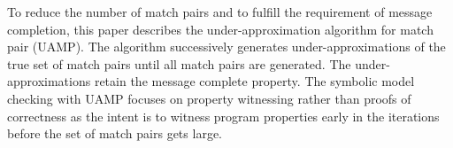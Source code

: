 

To reduce the number of match pairs and to fulfill the requirement of message completion, this paper describes the under-approximation algorithm for match pair (UAMP). The algorithm successively generates under-approximations of the true set of match pairs until all match pairs are generated. The under-approximations retain the message complete property. 
The symbolic model checking with UAMP focuses on property witnessing rather than proofs of correctness as the intent is to witness program properties early in the iterations before the set of match pairs gets large.


